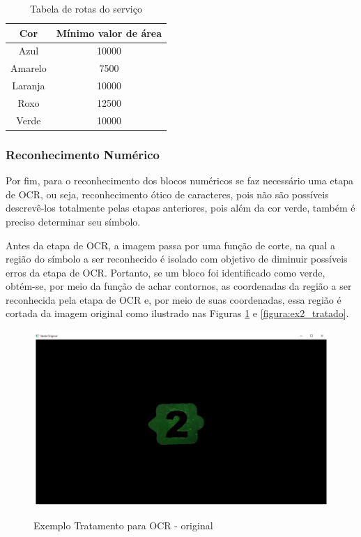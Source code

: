     \begin{table}[H]
        \centering
        \caption{Tabela de rotas do serviço}
        \label{table:area_values}
        \begin{tabular}{ |c|c| } 
         \hline
        Cor     & Mínimo valor de área \\
         \hline
        Azul    & 10000                \\
         \hline
        Amarelo & 7500                 \\
         \hline
        Laranja & 10000                \\
         \hline
        Roxo    & 12500                \\
         \hline
        Verde   & 10000                \\    [0.5ex]    
         \hline
        
        \end{tabular}
        
    \end{table}
    
        
    \subsubsection{Reconhecimento Numérico}
    Por fim, para o reconhecimento dos blocos numéricos se faz necessário uma etapa de OCR, ou seja, reconhecimento ótico de caracteres, pois não são possíveis descrevê-los totalmente pelas etapas anteriores, pois além da cor verde, também é preciso determinar seu símbolo.
    
    Antes da etapa de OCR, a imagem passa por uma função de corte, na qual a região do símbolo a ser reconhecido é isolado com objetivo de diminuir possíveis erros da etapa de OCR. Portanto, se um bloco foi identificado como verde, obtém-se, por meio da função de achar contornos,  as coordenadas da região a ser reconhecida pela etapa de OCR e, por meio de suas coordenadas, essa região é cortada da imagem original como ilustrado nas Figuras \ref{figura:ex2_original} e \ref{figura:ex2_tratado}.
    
    \begin{figure}[H]
        \caption{Exemplo Tratamento para OCR - original}
        \centering
        \includegraphics[width=14cm]{Imagens/Cap4/ex2_original.PNG}
        \label{figura:ex2_original}
    \end{figure}
    
